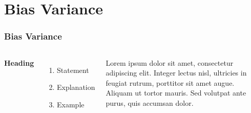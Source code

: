 
\section{Bias Variance}

\begin{frame}
    \frametitle{Bias Variance}
    \begin{columns}[c] %
    
    \textbf{Heading}
    \begin{enumerate}
    \item Statement
    \item Explanation
    \item Example
    \end{enumerate}
    
    Lorem ipsum dolor sit amet, consectetur adipiscing elit. Integer lectus nisl, ultricies in feugiat rutrum, porttitor sit amet augue. Aliquam ut tortor mauris. Sed volutpat ante purus, quis accumsan dolor.
    
    \end{columns}
\end{frame}